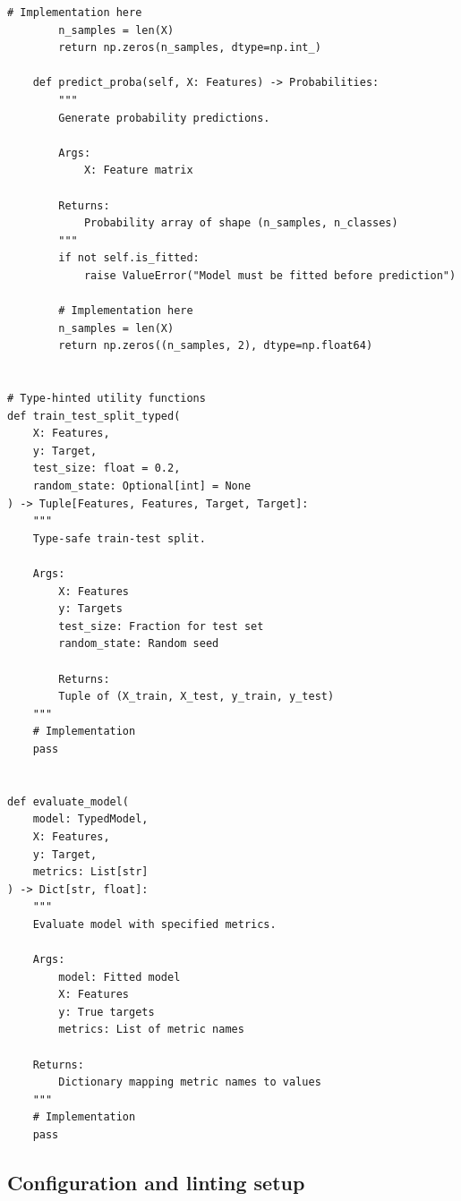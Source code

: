 \begin{lstlisting}[style=python, caption=Type hints for ML code]
        # Implementation here
        n_samples = len(X)
        return np.zeros(n_samples, dtype=np.int_)

    def predict_proba(self, X: Features) -> Probabilities:
        """
        Generate probability predictions.

        Args:
            X: Feature matrix

        Returns:
            Probability array of shape (n_samples, n_classes)
        """
        if not self.is_fitted:
            raise ValueError("Model must be fitted before prediction")

        # Implementation here
        n_samples = len(X)
        return np.zeros((n_samples, 2), dtype=np.float64)


# Type-hinted utility functions
def train_test_split_typed(
    X: Features,
    y: Target,
    test_size: float = 0.2,
    random_state: Optional[int] = None
) -> Tuple[Features, Features, Target, Target]:
    """
    Type-safe train-test split.

    Args:
        X: Features
        y: Targets
        test_size: Fraction for test set
        random_state: Random seed

        Returns:
        Tuple of (X_train, X_test, y_train, y_test)
    """
    # Implementation
    pass


def evaluate_model(
    model: TypedModel,
    X: Features,
    y: Target,
    metrics: List[str]
) -> Dict[str, float]:
    """
    Evaluate model with specified metrics.

    Args:
        model: Fitted model
        X: Features
        y: True targets
        metrics: List of metric names

    Returns:
        Dictionary mapping metric names to values
    """
    # Implementation
    pass
\end{lstlisting}

\subsection{Configuration and linting setup}

